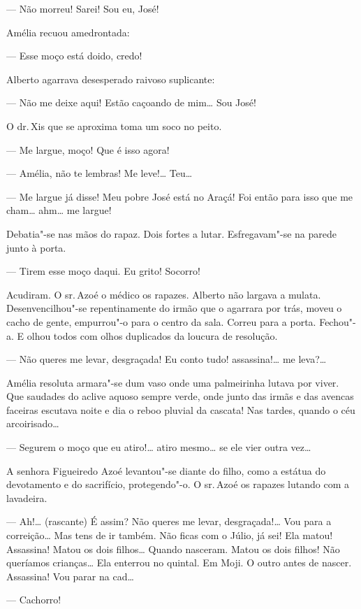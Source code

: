 \begin{linenumbers}
--- Não morreu! Sarei! Sou eu, José!

Amélia recuou amedrontada:

--- Esse moço está doido, credo!

Alberto agarrava desesperado raivoso suplicante:

--- Não me deixe aqui! Estão caçoando de mim\ldots{} Sou José!

O dr.\,Xis que se aproxima toma um soco no peito.

--- Me largue, moço! Que é isso agora!

--- Amélia, não te lembras! Me leve!\ldots{} Teu\ldots{}

--- Me largue já disse! Meu pobre José está no Araçá! Foi então para
isso que me cham\ldots{} ahm\ldots{} me largue!

Debatia"-se nas mãos do rapaz. Dois fortes a lutar. Esfregavam"-se na
parede junto à porta.

--- Tirem esse moço daqui. Eu grito! Socorro!

Acudiram. O sr.\,Azoé o médico os rapazes. Alberto não largava a mulata.
Desenvencilhou"-se repentinamente do irmão que o agarrara por trás, moveu
o cacho de gente, empurrou"-o para o centro da sala. Correu para a porta.
Fechou"-a. E olhou todos com olhos duplicados da loucura de resolução.

--- Não queres me levar, desgraçada! Eu conto tudo! assassina!\ldots{} me
leva?\ldots{}

Amélia resoluta armara"-se dum vaso onde uma palmeirinha lutava por
viver. Que saudades do aclive aquoso sempre verde, onde junto das irmãs
e das avencas faceiras escutava noite e dia o reboo pluvial da cascata!
Nas tardes, quando o céu arcoirisado\ldots{}

--- Segurem o moço que eu atiro!\ldots{} atiro mesmo\ldots{} se ele vier outra
vez\ldots{}

A senhora Figueiredo Azoé levantou"-se diante do filho, como a estátua do
devotamento e do sacrifício, protegendo"-o. O sr.\,Azoé os rapazes lutando
com a lavadeira.

--- Ah!\ldots{} (rascante) É assim? Não queres me levar, desgraçada!\ldots{} Vou
para a correição\ldots{} Mas tens de ir também. Não ficas com o Júlio, já
sei! Ela matou! Assassina! Matou os dois filhos\ldots{} Quando nasceram.
Matou os dois filhos! Não queríamos crianças\ldots{} Ela enterrou no quintal.
Em Moji. O outro antes de nascer. Assassina! Vou parar na cad\ldots{}

--- Cachorro!


\end{linenumbers}
